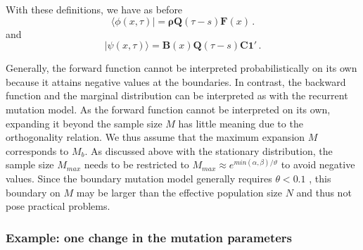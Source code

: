 \documentclass[preprint]{elsarticle}
\newcommand{\bs}[1]{\ensuremath{\boldsymbol{#1}}}
\newcommand\oneC{\ensuremath{\mathbf{1}'}}
\begin{document}
With these definitions, we have as before
\begin{equation}
\langle\phi(x,\tau)|=\bs{\rho}\mathbf{Q}(\tau-s)\mathbf{F}(x)\,.
\end{equation}
and
\begin{equation}\label{eq:backw_bound_drift_mat}
|\psi(x,\tau)\rangle=\mathbf{B}(x)\mathbf{Q}(\tau-s)\mathbf{C}\oneC\,.
\end{equation}

Generally, the forward function cannot be interpreted probabilistically on its own because it attains negative values at the boundaries. In contrast, the backward function and the marginal distribution can be interpreted as with the recurrent mutation model. As the forward function cannot be interpreted on its own, expanding it beyond the sample size $M$ has little meaning due to the orthogonality relation. We thus assume that the maximum expansion $M$ corresponds to $M_b$. As discussed above with the stationary distribution, the sample size $M_{max}$ needs to be restricted to $M_{max}\approx e^{min(\alpha,\beta)/\vartheta}$ to avoid negative values. Since the boundary mutation model generally requires $\theta<0.1$ \citep{Vogl15}, this boundary on $M$ may be larger than the effective population size $N$ and thus not pose practical problems. 

\subsubsection{Example: one change in the mutation parameters}
\end{document}
